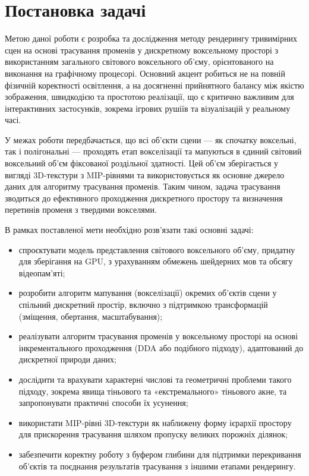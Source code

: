 \section{Постановка задачі}

Метою даної роботи є розробка та дослідження методу рендерингу тривимірних сцен на основі трасування променів у дискретному воксельному просторі з використанням загального світового воксельного об'єму, орієнтованого на виконання на графічному процесорі. Основний акцент робиться не на повній фізичній коректності освітлення, а на досягненні прийнятного балансу між якістю зображення, швидкодією та простотою реалізації, що є критично важливим для інтерактивних застосунків, зокрема ігрових рушіїв та візуалізацій у реальному часі.

У межах роботи передбачається, що всі об'єкти сцени — як спочатку воксельні, так і полігональні — проходять етап вокселізації та мапуються в єдиний світовий воксельний об'єм фіксованої роздільної здатності. Цей об'єм зберігається у вигляді 3D-текстури з MIP-рівнями та використовується як основне джерело даних для алгоритму трасування променів. Таким чином, задача трасування зводиться до ефективного проходження дискретного простору та визначення перетинів променя з твердими вокселями.

В рамках поставленої мети необхідно розв'язати такі основні задачі:

\begin{itemize}[itemsep=0pt, topsep=0pt, label=$\diamond$]
\item спроєктувати модель представлення світового воксельного об'єму, придатну для зберігання на GPU, з урахуванням обмежень шейдерних мов та обсягу відеопам'яті;
\item розробити алгоритм мапування (вокселізації) окремих об'єктів сцени у спільний дискретний простір, включно з підтримкою трансформацій (зміщення, обертання, масштабування);
\item реалізувати алгоритм трасування променів у воксельному просторі на основі інкрементального проходження (DDA або подібного підходу), адаптований до дискретної природи даних;
\item дослідити та врахувати характерні числові та геометричні проблеми такого підходу, зокрема явища тіньового та «екстремального» тіньового акне, та запропонувати практичні способи їх усунення;
\item використати MIP-рівні 3D-текстури як наближену форму ієрархії простору для прискорення трасування шляхом пропуску великих порожніх ділянок;
\item забезпечити коректну роботу з буфером глибини для підтримки перекривання об'єктів та поєднання результатів трасування з іншими етапами рендерингу.
\end{itemize}

